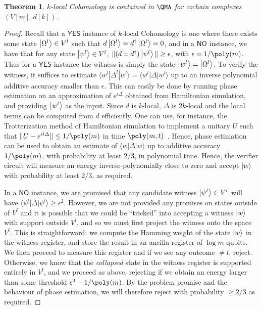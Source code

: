 \documentclass[11pt]{article}
\numberwithin{equation}{section}
\newcommand{\yes}{\mathsf{YES}}
\newcommand{\no}{\mathsf{NO}}
\renewcommand\( {\left(}
\renewcommand\) {\right)}
\newtheorem{thm}{Theorem}
\renewcommand{\braket}[1]{\langle #1 \rangle}
\begin{document}
\begin{thm}
    {\sc $k$-local Cohomology} is contained in $\QMA$ for cochain complexes $(V[m],d[k])$.
\end{thm}
\begin{proof}
    Recall that a $\yes$ instance of {\sc $k$-local Cohomology} is one where there exists some state $\ket{\Omega^l} \in V^l$ such that $d\ket{\Omega^l} = d^\dagger\ket{\Omega^l} = 0$, and in a $\no$ instance, we have that for any state $\ket{\psi^l} \in V^l$, $\| (d \pm d^\dagger) \ket{\psi^l}\| \geq \epsilon$, with $\epsilon = 1/\poly(m)$. Thus for a $\yes$ instance the witness is simply the state $\ket{w^l} =\ket{\Omega^l}$. To verify the witness, it suffices to estimate $\braket{w^l|\Delta^l|w^l} = \braket{w^l|\Delta|w^l}$ up to an inverse polynomial additive accuracy smaller than $\epsilon$. This can easily be done by running phase estimation on an approximation of $e^{i\Delta}$ obtained from Hamiltonian simulation, and providing $\ket{w^l}$ as the input. 
    Since $d$ is $k$-local, $\Delta$ is $2k$-local and the local terms can be  computed from $d$ efficiently. One can use, for instance, the Trotterization method of Hamiltonian simulation to implement a unitary $U$ such that $\|U - e^{it\Delta}\| \leq 1/\poly(m)$ in time $\poly(m,t)$~\cite{lloyd1996universal}. Hence, phase estimation can be used to obtain an estimate of $\braket{w|\Delta|w}$ up to additive accuracy $1/\poly(m)$, with probability at least $2/3$, in polynomial time. Hence, the verifier circuit will measure an energy inverse-polynomially close to zero and accept $\ket{w}$ with probability at least $2/3$, as required.  
    
    In a $\no$ instance, we are promised that any candidate witness $\ket{\psi^l} \in V^l$ will have $\braket{\psi^l|\Delta|\psi^l} \geq \epsilon^2$. However, we are not provided any promises on states outside of $V^l$ and it is possible that we could be ``tricked'' into accepting a witness $\ket{w}$ with support outside $V^l$, and so we must first project the witness onto the space $V^l$. This is straightforward: we compute the Hamming weight of the state $\ket{w}$ in the witness register, and store the result in an ancilla register of $\log m$ qubits. We then proceed to measure this register and if we see any outcome $\neq l$, reject. Otherwise, we know that the {\it collapsed} state in the witness register is supported entirely in $V^l$, and we proceed as above, rejecting if we obtain an energy larger than some threshold $\epsilon^2 - 1/\poly(m)$. By the problem promise and the behaviour of phase estimation, we will therefore reject with probability $\geq 2/3$ as required. 
\end{proof}
\end{document}

